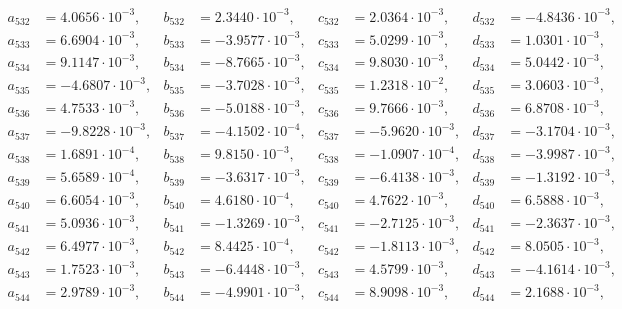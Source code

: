\begin{align*}
  a_{ 532 } &= 4.0656 \cdot 10^{ -3 }, & b_{ 532 } &= 2.3440 \cdot 10^{ -3 }, & c_{ 532 } &= 2.0364 \cdot 10^{ -3 }, & d_{ 532 } &= -4.8436 \cdot 10^{ -3 }, \\ 
  a_{ 533 } &= 6.6904 \cdot 10^{ -3 }, & b_{ 533 } &= -3.9577 \cdot 10^{ -3 }, & c_{ 533 } &= 5.0299 \cdot 10^{ -3 }, & d_{ 533 } &= 1.0301 \cdot 10^{ -3 }, \\ 
  a_{ 534 } &= 9.1147 \cdot 10^{ -3 }, & b_{ 534 } &= -8.7665 \cdot 10^{ -3 }, & c_{ 534 } &= 9.8030 \cdot 10^{ -3 }, & d_{ 534 } &= 5.0442 \cdot 10^{ -3 }, \\ 
  a_{ 535 } &= -4.6807 \cdot 10^{ -3 }, & b_{ 535 } &= -3.7028 \cdot 10^{ -3 }, & c_{ 535 } &= 1.2318 \cdot 10^{ -2 }, & d_{ 535 } &= 3.0603 \cdot 10^{ -3 }, \\ 
  a_{ 536 } &= 4.7533 \cdot 10^{ -3 }, & b_{ 536 } &= -5.0188 \cdot 10^{ -3 }, & c_{ 536 } &= 9.7666 \cdot 10^{ -3 }, & d_{ 536 } &= 6.8708 \cdot 10^{ -3 }, \\ 
  a_{ 537 } &= -9.8228 \cdot 10^{ -3 }, & b_{ 537 } &= -4.1502 \cdot 10^{ -4 }, & c_{ 537 } &= -5.9620 \cdot 10^{ -3 }, & d_{ 537 } &= -3.1704 \cdot 10^{ -3 }, \\ 
  a_{ 538 } &= 1.6891 \cdot 10^{ -4 }, & b_{ 538 } &= 9.8150 \cdot 10^{ -3 }, & c_{ 538 } &= -1.0907 \cdot 10^{ -4 }, & d_{ 538 } &= -3.9987 \cdot 10^{ -3 }, \\ 
  a_{ 539 } &= 5.6589 \cdot 10^{ -4 }, & b_{ 539 } &= -3.6317 \cdot 10^{ -3 }, & c_{ 539 } &= -6.4138 \cdot 10^{ -3 }, & d_{ 539 } &= -1.3192 \cdot 10^{ -3 }, \\ 
  a_{ 540 } &= 6.6054 \cdot 10^{ -3 }, & b_{ 540 } &= 4.6180 \cdot 10^{ -4 }, & c_{ 540 } &= 4.7622 \cdot 10^{ -3 }, & d_{ 540 } &= 6.5888 \cdot 10^{ -3 }, \\ 
  a_{ 541 } &= 5.0936 \cdot 10^{ -3 }, & b_{ 541 } &= -1.3269 \cdot 10^{ -3 }, & c_{ 541 } &= -2.7125 \cdot 10^{ -3 }, & d_{ 541 } &= -2.3637 \cdot 10^{ -3 }, \\ 
  a_{ 542 } &= 6.4977 \cdot 10^{ -3 }, & b_{ 542 } &= 8.4425 \cdot 10^{ -4 }, & c_{ 542 } &= -1.8113 \cdot 10^{ -3 }, & d_{ 542 } &= 8.0505 \cdot 10^{ -3 }, \\ 
  a_{ 543 } &= 1.7523 \cdot 10^{ -3 }, & b_{ 543 } &= -6.4448 \cdot 10^{ -3 }, & c_{ 543 } &= 4.5799 \cdot 10^{ -3 }, & d_{ 543 } &= -4.1614 \cdot 10^{ -3 }, \\ 
  a_{ 544 } &= 2.9789 \cdot 10^{ -3 }, & b_{ 544 } &= -4.9901 \cdot 10^{ -3 }, & c_{ 544 } &= 8.9098 \cdot 10^{ -3 }, & d_{ 544 } &= 2.1688 \cdot 10^{ -3 }, \\ 

\end{align*}
